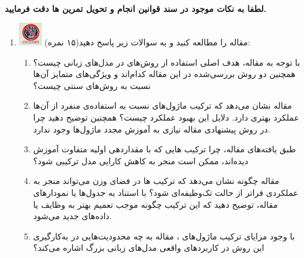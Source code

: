 \documentclass[12pt]{article}
\begin{document}
\fontsize{12pt}{14pt}\selectfont



\\
{\fontsize{14}{22}\selectfont \textbf{لطفا به نکات موجود در سند قوانین انجام و تحویل تمرین ها دقت فرمایید. }}

\begin{enumerate}

    \section*{سوالات تئوری}
    \item \includegraphics[width=1cm]{figs/Forbidden_AI.jpg}
    مقاله \href{https://proceedings.neurips.cc/paper_files/paper/2023/file/299a08ee712d4752c890938da99a77c6-Paper-Conference.pdf}{} را مطالعه کنید و به سوالات زیر پاسخ دهید(۱۵ نمره):
    \begin{enumerate}
        \item با توجه به مقاله، هدف اصلی استفاده از روش‌های  در مدل‌های زبانی چیست؟ همچنین دو روش  بررسی‌شده در این مقاله کدام‌اند و ویژگی‌های متمایز آن‌ها نسبت به روش‌های سنتی  چیست؟
        \item  مقاله نشان می‌دهد که ترکیب ماژول‌های  نسبت به استفاده‌ی منفرد از آن‌ها عملکرد بهتری دارد. دلایل این بهبود عملکرد چیست؟ همچنین توضیح دهید چرا در روش پیشنهادی مقاله نیازی به آموزش مجدد ماژول‌ها وجود ندارد.
        \item طبق یافته‌های مقاله، چرا ترکیب  هایی که با مقداردهی اولیه متفاوت آموزش دیده‌اند، ممکن است منجر به کاهش کارایی مدل ترکیبی شود؟ 
        \item مقاله چگونه نشان می‌دهد که ترکیب  ها در فضای وزن می‌تواند منجر به عملکردی فراتر از حالت تک‌وظیفه‌ای شود؟ با استناد به جدول‌ها یا نمودارهای مقاله، توضیح دهید که این ترکیب چگونه موجب تعمیم بهتر به وظایف یا داده‌های جدید می‌شود.
        \item با وجود مزایای ترکیب ماژول‌های ، مقاله به چه محدودیت‌هایی در به‌کارگیری این روش در کاربردهای واقعی مدل‌های زبانی بزرگ اشاره می‌کند؟ 
    \end{enumerate}
     

\end{enumerate}
\end{document}
